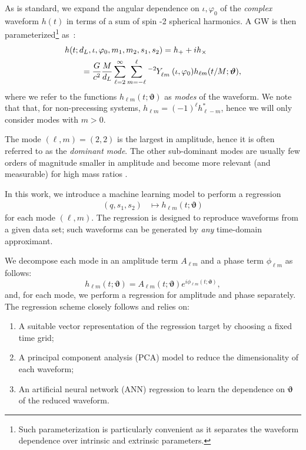 \documentclass[twocolumn,showpacs,preprintnumbers,nofootinbib,prd,
superscriptaddress,10pt]{revtex4-1}
\begin{document}
As is standard, we expand the angular dependence on $\iota, \varphi_0$ of the {\it complex} waveform $h(t)$ 
in terms of a sum of spin -2 spherical harmonics.
A GW is then parameterized\footnote{Such parameterization is particularly convenient as it separates 
the waveform dependence over intrinsic and extrinsic parameters.} as~\cite{Estelles:2021gvs}:
\begin{align} \label{eq:h_parametrization}
	&h(t; d_L,\iota,\varphi_0, m_1, m_2, s_1, s_2) = h_+ + i h_\times \nonumber \\
		&\qquad= \frac{G}{c^2} \frac{M}{d_L}\sum_{\ell = 2}^{\infty} \sum_{m = -\ell}^{\ell} \tensor[^{-2}]{Y}{_{\ell m}}(\iota, \varphi_0) h_{\ell m}(t/M; \boldsymbol{\vartheta}),
\end{align}
where we refer to the functions $h_{\ell m}(t; \boldsymbol{\vartheta})$ as {\it modes} of the waveform. We note that that, 
for non-precessing systems, $h_{\ell m} = (-1)^\ell h^*_{\ell -m}$, hence we will only consider modes with $m>0$.

The mode $(\ell, m) = (2,2)$ is the largest in amplitude, hence it is often referred to as the {\it dominant mode}. 
The other sub-dominant modes are usually few orders of magnitude smaller in amplitude and become more relevant 
(and measurable) for high mass ratios \cite{Mills:2020thr, LIGOScientific:2020stg, LIGOScientific:2020zkf}.

In this work, we introduce a machine learning model to perform a regression
\begin{align}\label{eq:objective}
	(q, s_1, s_2) &\longmapsto h_{\ell m}(t; \boldsymbol{\vartheta})
\end{align}
for each mode $(\ell,m)$.
The regression is designed to reproduce waveforms from a given data set; such waveforms can be generated 
by {\it any} time-domain approximant.

We decompose each mode in an amplitude term $A_{\ell m}$ and a phase term $\phi_{\ell m}$ as follows:
\begin{equation}
	h_{\ell m}(t; \boldsymbol{\vartheta}) = A_{\ell m}(t; \boldsymbol{\vartheta}) e^{i \phi_{\ell m}(t; \boldsymbol{\vartheta})},
\end{equation}
and, for each mode, we perform a regression for amplitude and phase separately. The regression scheme closely follows \cite{Schmidt:2020yuu} and relies on:
\begin{enumerate}[label=(\alph*)]
	\item A suitable vector representation of the regression target by choosing a fixed time grid;
	\item A principal component analysis (PCA) model to reduce the dimensionality of each waveform;
	\item An artificial neural network (ANN) regression to learn the dependence on $\boldsymbol{\vartheta}$ of the 
	reduced waveform.
\end{enumerate}
\end{document}
